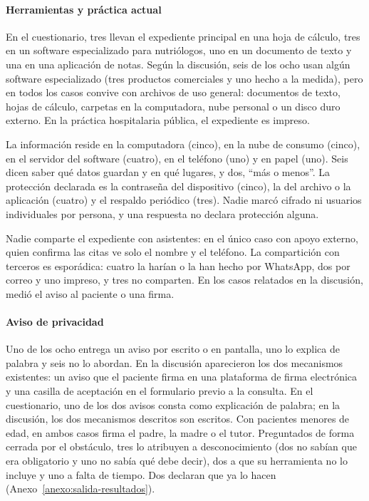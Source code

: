 \documentclass[12pt, a4paper]{article}
\begin{document}
\paragraph{Herramientas y práctica actual}
En el cuestionario, tres llevan el expediente principal en una hoja de
cálculo, tres en un software especializado para nutriólogos, uno en un
documento de texto y una en una aplicación de notas. Según la discusión, seis de los ocho usan algún software especializado (tres
productos comerciales y uno hecho a la medida), pero en todos los casos
convive con archivos de uso general: documentos de texto, hojas de
cálculo, carpetas en la computadora, nube personal o un disco duro
externo. En la práctica hospitalaria pública, el expediente es impreso.

La información reside en la computadora (cinco), en la nube de consumo
(cinco), en el servidor del software (cuatro), en el teléfono (uno) y en
papel (uno). Seis dicen saber qué datos guardan y en qué lugares, y dos,
``más o menos''. La protección declarada es la contraseña del dispositivo
(cinco), la del archivo o la aplicación (cuatro) y el respaldo periódico
(tres). Nadie marcó cifrado ni usuarios individuales por persona, y una
respuesta no declara protección alguna.

Nadie comparte el expediente con asistentes: en el único caso con apoyo
externo, quien confirma las citas ve solo el nombre y el teléfono. La
compartición con terceros es esporádica: cuatro la harían o la han hecho
por WhatsApp, dos por correo y uno impreso, y tres no comparten. En los
casos relatados en la discusión, medió el aviso al paciente o una firma.
 
\paragraph{Aviso de privacidad}
Uno de los ocho entrega un aviso por escrito o en pantalla, uno lo
explica de palabra y seis no lo abordan. En la discusión aparecieron los
dos mecanismos existentes: un aviso que el paciente firma en una
plataforma de firma electrónica y una casilla de aceptación en el
formulario previo a la consulta. En el cuestionario, uno de los dos
avisos consta como explicación de palabra; en la discusión, los dos
mecanismos descritos son escritos. Con pacientes menores de edad, en ambos
casos firma el padre, la madre o el tutor. Preguntados de forma cerrada
por el obstáculo, tres lo atribuyen a desconocimiento (dos no sabían que
era obligatorio y uno no sabía qué debe decir), dos a que su herramienta
no lo incluye y uno a falta de tiempo. Dos declaran que ya lo hacen
(Anexo~\ref{anexo:salida-resultados}).
 
\end{document}
